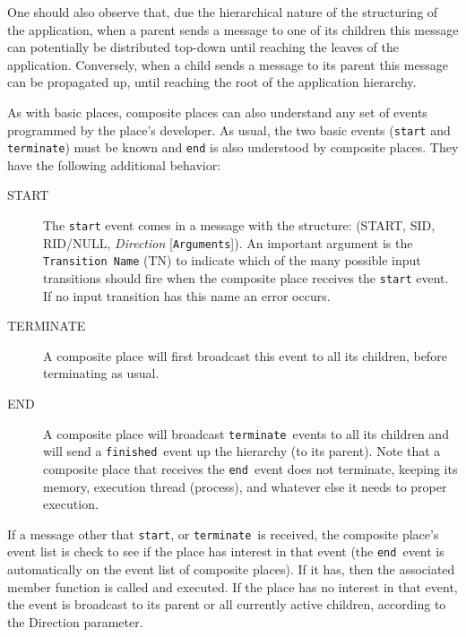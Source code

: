 \documentclass[twocolumn,10pt]{article}
\newcommand{\term}{{\tt terminate}}
\newcommand{\theEnd}{{\tt end}}
\newcommand{\finished}{{\tt finished}}
\newcommand{\start}{{\tt start}}
\newcommand{\termRep}{TERMINATE}
\newcommand{\theEndRep}{END}
\newcommand{\startRep}{START}
\newcommand{\event}[1]{{\tt #1}}
\begin{document}
One should also observe that, due
the hierarchical nature of the structuring of the application,
when a parent sends a message to one of
its children this message can potentially be distributed top-down
until reaching the leaves of the application.  Conversely, when a
child sends a message to its parent this message can be propagated
up, until reaching the root of the application hierarchy.

As with basic places, composite places can also understand any set of
events programmed by the place's developer.  As usual, the two basic
events (\event{start} and \event{terminate}) must be known and
\event{end} is also understood by composite places.  They have the
following additional behavior:

\begin{description}
\item [\startRep] \label{par:start_message} The \event{start} event
      comes in a message with the structure: (\startRep, SID,
      RID/NULL, {\em Direction}
      [{\tt Arguments}]).  An important argument is the {\tt Transition
      Name} (TN) to indicate which of the many possible input
      transitions should fire when the composite place receives the
      \event{start} event.  If no input transition has this name an
      error occurs.
\item [\termRep]  A composite place will first broadcast this event to
      all its children, before terminating as usual.

\item [\theEndRep] \label{par:end_message} A composite place will
      broadcast \term\ events to all its children and will send a \finished\
      event up the hierarchy  (to its parent).
      Note that a composite place that receives the \theEnd\ event does
      not terminate, keeping its memory, execution thread (process), and
      whatever else it needs to proper execution.

\end{description}

If a message other that \start, or \term\ is received, the composite
place's event list is check to see if the place has interest in that
event (the \theEnd\ event is automatically on the event list of
composite places).  If it has, then the
associated member function is called and executed.  If the place has
no interest in that event, the event is broadcast to its parent or all
currently  active children, according to the Direction parameter.
\end{document}
